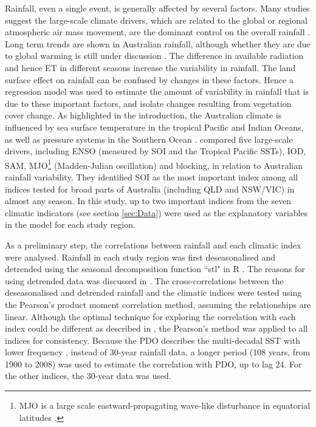 \documentclass[draft,linenumbers]{agujournal}
\begin{document}
\begin{article}
Rainfall, even a single event, is generally affected by several factors. Many studies suggest the large-scale climate drivers, which are related to the global or regional atmospheric air mass movement, are the dominant control on the overall rainfall \citep{Maynard2003,DeAngelis2010,Holper2011,Smith2012}. Long term trends are shown in Australian rainfall, although whether they are due to global warming is still under discussion \citep{Wardle2004,Nicholls2006,Holper2011}.
The difference in available radiation and hence ET in different seasons increase the variability in rainfall. The land surface effect on rainfall can be confused by changes in these factors. Hence a regression model was used to estimate the amount of variability in rainfall that is due to these important factors, and isolate changes resulting from vegetation cover change.
As highlighted in the introduction, the Australian climate is influenced by sea surface temperature in the tropical Pacific and Indian Oceans, as well as pressure systems in the Southern Ocean \citep{BoM2012}.  \citet{Risbey2009} compared five large-scale drivers, including ENSO (measured by SOI and the Tropical Pacific SSTs), IOD, SAM, MJO\footnote{MJO is a large scale eastward-propagating wave-like disturbance in equatorial latitudes \citep{Risbey2009}.} (Madden-Julian oscillation) and blocking, in relation to Australian rainfall variability. They identified SOI as the most important index among all indices tested for broad parts of Australia (including QLD and NSW/VIC) in almost any season. In this study, up to two important indices from the seven climatic indicators (see section \ref{sec:Data}) were used as the explanatory variables in the model for each study region.



As a preliminary step, the correlations between rainfall and each climatic index were analysed. Rainfall in each study region was first deseasonalised and detrended using the seasonal decomposition function ``stl" in R \citep{Rstats2011}. The reasons for using detrended data was discussed in \citet{Smith2012}. %
The cross-correlations between the deseasonalised and detrended rainfall and the climatic indices were tested using the Pearson's product moment correlation method, assuming the relationships are linear. Although the optimal technique for exploring the correlation with each index could be different as described in \citet{Risbey2009}, the Pearson's method was applied to all indices for consistency. Because the PDO describes the multi-decadal SST with lower frequency \citep{MacDonald2005,Zanchettin2008,Kamruzzaman2011}, instead of 30-year rainfall data, a longer period (108 years, from 1900 to 2008) was used to estimate the correlation with PDO, up to lag 24. For the other indices, the 30-year data was used. %


\end{article}
\end{document}
